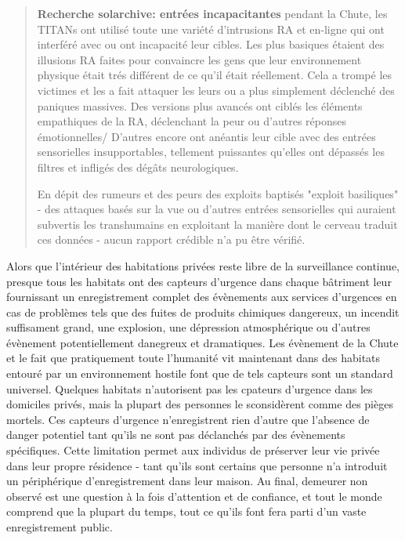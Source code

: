             \begin{quotation} \textbf{Recherche solarchive: entrées incapacitantes } pendant la Chute, les TITANs ont utilisé toute une variété d'intrusions RA et en-ligne qui ont interféré avec ou ont incapacité leur cibles. Les plus basiques étaient des illusions RA faites pour convaincre les gens que leur environnement physique était trés différent de ce qu'il était réellement. Cela a trompé les victimes et les a fait attaquer les leurs ou a plus simplement déclenché des paniques massives. Des versions plus avancés ont ciblés les éléments empathiques de la RA, déclenchant la peur ou d'autres réponses émotionnelles/ D'autres encore ont anéantis leur cible avec des entrées sensorielles insupportables, tellement puissantes qu'elles ont dépassés les filtres et infligés des dégâts neurologiques. 

               En dépit des rumeurs et des peurs des exploits baptisés "exploit basiliques" - des attaques basés sur la vue ou d'autres entrées sensorielles qui auraient subvertis les transhumains en exploitant la manière dont le cerveau traduit ces données - aucun rapport crédible n'a pu être vérifié. \end{quotation} 

               Alors que l'intérieur des habitations privées reste libre de la surveillance continue, presque tous les habitats ont des capteurs d'urgence dans chaque bâtriment leur fournissant un enregistrement complet des évènements aux services d'urgences en cas de problèmes tels que des fuites de produits chimiques dangereux, un incendit suffisament grand, une explosion, une dépression atmosphérique ou d'autres évènement potentiellement danegreux et dramatiques. Les évènement de la Chute et le fait que pratiquement toute l'humanité vit maintenant dans des habitats entouré par un environnement hostile font que de tels capteurs sont un standard universel. Quelques habitats n'autorisent pas les cpateurs d'urgence dans les domiciles privés, mais la plupart des personnes le sconsidèrent comme des pièges mortels. Ces capteurs d'urgence n'enregistrent rien d'autre que l'absence de danger potentiel tant qu'ils ne sont pas déclanchés par des évènements spécifiques. Cette limitation permet aux individus de préserver leur vie privée dans leur propre résidence - tant qu'ils sont certains que personne n'a introduit un périphérique d'enregistrement dans leur maison. Au final, demeurer non observé est une question à la fois d'attention et de confiance, et tout le monde comprend que la plupart du temps, tout ce qu'ils font fera parti d'un vaste enregistrement public. 

